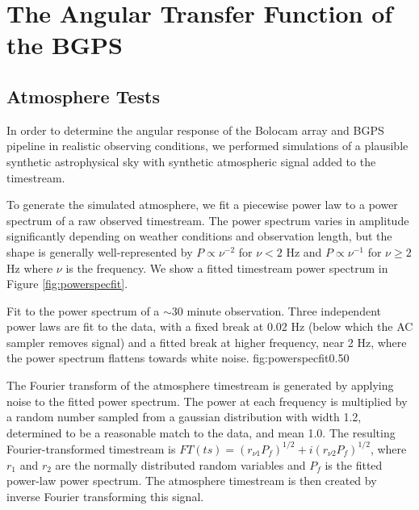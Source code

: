 

\section{The Angular Transfer Function of the BGPS} 


\subsection{Atmosphere Tests}
\label{sec:atmotests}
In order to determine the angular response of the Bolocam array and BGPS
pipeline in realistic observing conditions, we performed simulations of a
plausible synthetic astrophysical sky with synthetic atmospheric signal added
to the timestream.

To generate the simulated atmosphere, we fit a piecewise power law to a power
spectrum of a raw observed timestream.  The power spectrum varies in amplitude significantly
depending on weather conditions and observation length, but the shape is
generally well-represented by $P\propto \nu^{-2}$ for $\nu < 2 $ Hz and $P \propto \nu^{-1} $
for $\nu \geq 2$ Hz where $\nu$ is the frequency.  
We show a fitted timestream power spectrum in Figure \ref{fig:powerspecfit}.



{Fit to the power spectrum of a $\sim30$ minute observation.  Three independent power
laws are fit to the data,  with a fixed break at 0.02 Hz (below which the AC sampler
removes signal) and a fitted break at
higher frequency, near 2 Hz, where the power spectrum flattens towards white noise.  
}
{fig:powerspecfit}{0.5}{0}



The Fourier transform of the atmosphere timestream is generated by applying noise
to the fitted power spectrum.  The power at each frequency is multiplied by a
random number sampled from a gaussian distribution with width 1.2, determined
to be a reasonable match to the data, and mean 1.0.
The resulting Fourier-transformed timestream is $FT(ts) = (r_{\nu1} P_f)^{1/2} + i
(r_{\nu2} P_f)^{1/2}$, where $r_1$ and $r_2$ are the normally distributed random
variables and $P_f$ is the fitted power-law power spectrum.
The atmosphere timestream is then created by inverse Fourier transforming 
this signal.



